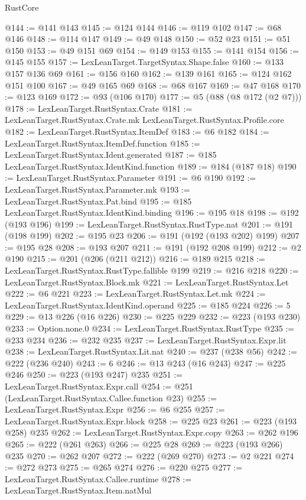 \begin{lexlean}{RustCore}
\begin{coremodule}
@144 := @141 @143
@145 := @124 @144
@146 := @119 @102
@147 := @68 @146
@148 := @114 @147
@149 := @49 @148
@150 := @52 @23
@151 := @51 @150
@153 := @49 @151 @69
@154 := @149 @153
@155 := @141 @154
@156 := @145 @155
@157 := LexLeanTarget.TargetSyntax.Shape.false
@160 := @133 @157 @136 @69
@161 := @156 @160
@162 := @139 @161
@165 := @124 @162 @151 @100
@167 := @49 @165 @69
@168 := @68 @167
@169 := @47 @168
@170 := @123 @169
@172 := @93 (@106 @170)
@177 := @5 (@88 (@8 @172 (@2 @7)))
@178 := LexLeanTarget.RustSyntax.Crate
@181 := LexLeanTarget.RustSyntax.Crate.mk LexLeanTarget.RustSyntax.Profile.core
@182 := LexLeanTarget.RustSyntax.ItemDef
@183 := @6 @182
@184 := LexLeanTarget.RustSyntax.ItemDef.function
@185 := LexLeanTarget.RustSyntax.Ident.generated
@187 := @185 LexLeanTarget.RustSyntax.IdentKind.function
@189 := @184 (@187 @18)
@190 := LexLeanTarget.RustSyntax.Parameter
@191 := @6 @190
@192 := LexLeanTarget.RustSyntax.Parameter.mk
@193 := LexLeanTarget.RustSyntax.Pat.bind
@195 := @185 LexLeanTarget.RustSyntax.IdentKind.binding
@196 := @195 @18
@198 := @192 (@193 @196)
@199 := LexLeanTarget.RustSyntax.RustType.nat
@201 := @191 (@198 @199)
@202 := @195 @23
@206 := @191 (@192 (@193 @202) @199)
@207 := @195 @28
@208 := @193 @207
@211 := @191 (@192 @208 @199)
@212 := @2 @190
@215 := @201 (@206 (@211 @212))
@216 := @189 @215
@218 := LexLeanTarget.RustSyntax.RustType.fallible @199
@219 := @216 @218
@220 := LexLeanTarget.RustSyntax.Block.mk
@221 := LexLeanTarget.RustSyntax.Let
@222 := @6 @221
@223 := LexLeanTarget.RustSyntax.Let.mk
@224 := LexLeanTarget.RustSyntax.IdentKind.operand
@225 := @185 @224
@226 := 5
@229 := @13 @226 (@16 @226)
@230 := @225 @229
@232 := @223 (@193 @230)
@233 := Option.none.{0}
@234 := LexLeanTarget.RustSyntax.RustType
@235 := @233 @234
@236 := @232 @235
@237 := LexLeanTarget.RustSyntax.Expr.lit
@238 := LexLeanTarget.RustSyntax.Lit.nat
@240 := @237 (@238 @56)
@242 := @222 (@236 @240)
@243 := 6
@246 := @13 @243 (@16 @243)
@247 := @225 @246
@250 := @223 (@193 @247) @235
@251 := LexLeanTarget.RustSyntax.Expr.call
@254 := @251 (LexLeanTarget.RustSyntax.Callee.function @23)
@255 := LexLeanTarget.RustSyntax.Expr
@256 := @6 @255
@257 := LexLeanTarget.RustSyntax.Expr.block
@258 := @225 @23
@261 := @223 (@193 @258) @235
@262 := LexLeanTarget.RustSyntax.Expr.copy
@263 := @262 @196
@265 := @222 (@261 @263)
@266 := @225 @28
@269 := @223 (@193 @266) @235
@270 := @262 @207
@272 := @222 (@269 @270)
@273 := @2 @221
@274 := @272 @273
@275 := @265 @274
@276 := @220 @275
@277 := LexLeanTarget.RustSyntax.Callee.runtime
@278 := LexLeanTarget.RustSyntax.Item.natMul

\end{coremodule}
\end{lexlean}
